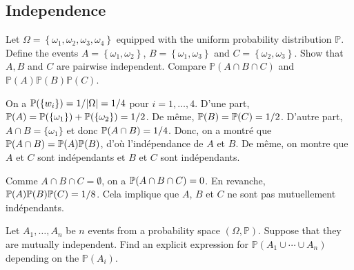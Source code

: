 \begin{center}
  \section*{Independence}
\end{center}

\begin{Exercise}[origin=Independent events]
  Let $\Omega=\left\{\omega_{1}, \omega_{2}, \omega_{3}, \omega_{4}\right\}$ equipped with the uniform probability distribution $\mathbb{P}$. Define the events $A=\left\{\omega_{1}, \omega_{2}\right\}$, $B=\left\{\omega_{1}, \omega_{3}\right\}$ and $C=\left\{\omega_{2}, \omega_{3}\right\}$.
  Show that $A, B$ and $C$ are pairwise independent. Compare $\mathbb{P}(A \cap B \cap C)$ and $\mathbb{P}(A) \mathbb{P}(B) \mathbb{P}(C)$.
\end{Exercise}

\vspace{0.5cm}

\begin{solution}
  On a $\mathbb{P}(\{w_i\})=1/|\Omega|=1/4$ pour $i=1,\dots,4$.
  D'une part, $\mathbb{P}(A)=\mathbb{P}(\{\omega_1\})+\mathbb{P}(\{\omega_2\})=1/2$. De même, $\mathbb{P}(B)=\mathbb{P}(C)=1/2$. D'autre part, $A\cap B=\{\omega_1\}$ et donc $\mathbb{P}(A\cap B)=1/4$. Donc, on a montr\'e que
  $\mathbb{P}(A\cap B)=\mathbb{P}(A)\mathbb{P}(B)$, d'où l'ind\'ependance de $A$ et $B$. De même, on montre que $A$ et $C$ sont ind\'ependants et $B$ et $C$ sont ind\'ependants.

  Comme $A \cap B \cap C=\emptyset$, on a  $\mathbb{P}(A \cap B \cap C)=0$. En revanche, $\mathbb{P}(A) \mathbb{P}(B) \mathbb{P}(C)=1/8$. Cela implique que $A$, $B$ et $C$ ne sont pas mutuellement ind\'ependants.
\end{solution}

\begin{Exercise}
  Let $A_1, \ldots , A_n$ be $n$ events from a probability space $(\Omega, \mathbb{P})$.
  Suppose that they are mutually independent. Find an explicit expression for $\mathbb{P}(A_1 \cup \cdots \cup A_n)$ depending on the $\mathbb{P}(A_i)$.
\end{Exercise}


